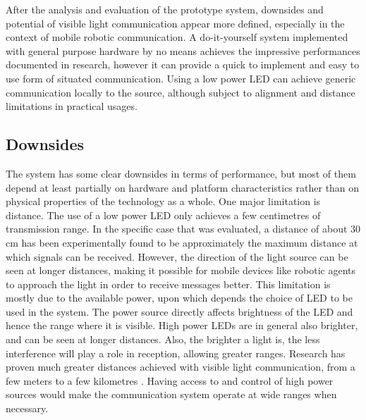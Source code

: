 

After the analysis and evaluation of the prototype system, downsides and potential of visible light communication appear more defined, especially in the context of mobile robotic communication.
A do-it-yourself system implemented with general purpose hardware by no means achieves the impressive performances documented in research, however it can provide a quick to implement and easy to use form of situated communication.
Using a low power LED can achieve generic communication locally to the source, although subject to alignment and distance limitations in practical usages.

\subsection{Downsides}
The system has some clear downsides in terms of performance, but most of them depend at least partially on hardware and platform characteristics rather than on physical properties of the technology as a whole.
One major limitation is distance. The use of a low power LED only achieves a few centimetres of transmission range.
In the specific case that was evaluated, a distance of about 30 cm has been experimentally found to be approximately the maximum distance at which signals can be received.
However, the direction of the light source can be seen at longer distances, making it possible for mobile devices like robotic agents to approach the light in order to receive messages better.
This limitation is mostly due to the available power, upon which depends the choice of LED to be used in the system.
The power source directly affects brightness of the LED and hence the range where it is visible.
High power LEDs are in general also brighter, and can be seen at longer distances.
Also, the brighter a light is, the less interference will play a role in reception, allowing greater ranges.
Research has proven much greater distances achieved with visible light communication, from a few meters to a few kilometres \cite{ronja}.
Having access to and control of high power sources would make the communication system operate at wide ranges when necessary.


